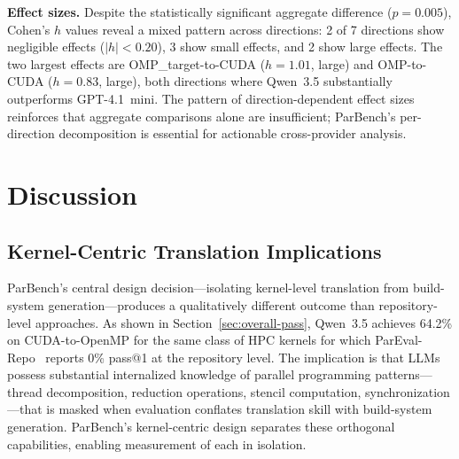 \documentclass[conference]{IEEEtran}
\begin{document}
\textbf{Effect sizes.}
Despite the statistically significant aggregate difference ($p = 0.005$),
Cohen's $h$ values reveal a mixed pattern across directions: 2 of 7
directions show negligible effects ($|h| < 0.20$), 3 show small effects,
and 2 show large effects. The two largest effects are
OMP\_target-to-CUDA ($h = 1.01$, large) and OMP-to-CUDA ($h = 0.83$,
large), both directions where Qwen~3.5 substantially outperforms
GPT-4.1~mini. The pattern of direction-dependent effect sizes reinforces
that aggregate comparisons alone are insufficient; ParBench's per-direction
decomposition is essential for actionable cross-provider analysis.

\section{Discussion}
\label{sec:discussion}

\subsection{Kernel-Centric Translation Implications}
\label{sec:kernel-advantage}

ParBench's central design decision---isolating kernel-level translation from build-system generation---produces a qualitatively different outcome than repository-level approaches. As shown in Section~\ref{sec:overall-pass}, Qwen~3.5 achieves 64.2\% on CUDA-to-OpenMP for the same class of HPC kernels for which ParEval-Repo~\cite{ParEvalRepo2025} reports 0\% pass@1 at the repository level. The implication is that LLMs possess substantial internalized knowledge of parallel programming patterns---thread decomposition, reduction operations, stencil computation, synchronization---that is masked when evaluation conflates translation skill with build-system generation. ParBench's kernel-centric design separates these orthogonal capabilities, enabling measurement of each in isolation.
\end{document}
